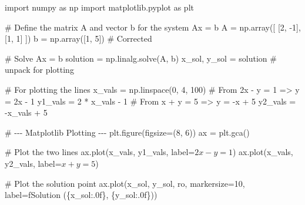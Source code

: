 \documentclass[
  letterpaper,
  DIV=11,
  numbers=noendperiod]{scrreprt}
\newenvironment{Shaded}{\begin{snugshade}}{\end{snugshade}}
\newcommand{\CommentTok}[1]{\textcolor[rgb]{0.37,0.37,0.37}{#1}}
\newcommand{\DecValTok}[1]{\textcolor[rgb]{0.68,0.00,0.00}{#1}}
\newcommand{\ImportTok}[1]{\textcolor[rgb]{0.00,0.46,0.62}{#1}}
\newcommand{\NormalTok}[1]{\textcolor[rgb]{0.00,0.23,0.31}{#1}}
\newcommand{\OperatorTok}[1]{\textcolor[rgb]{0.37,0.37,0.37}{#1}}
\newcommand{\SpecialCharTok}[1]{\textcolor[rgb]{0.37,0.37,0.37}{#1}}
\newcommand{\SpecialStringTok}[1]{\textcolor[rgb]{0.13,0.47,0.30}{#1}}
\newcommand{\StringTok}[1]{\textcolor[rgb]{0.13,0.47,0.30}{#1}}
\begin{document}
\begin{Shaded}
\begin{Highlighting}[]
\ImportTok{import}\NormalTok{ numpy }\ImportTok{as}\NormalTok{ np}
\ImportTok{import}\NormalTok{ matplotlib.pyplot }\ImportTok{as}\NormalTok{ plt}

\CommentTok{\# Define the matrix A and vector b for the system Ax = b}
\NormalTok{A }\OperatorTok{=}\NormalTok{ np.array([}
\NormalTok{    [}\DecValTok{2}\NormalTok{, }\OperatorTok{{-}}\DecValTok{1}\NormalTok{],}
\NormalTok{    [}\DecValTok{1}\NormalTok{,  }\DecValTok{1}\NormalTok{]}
\NormalTok{])}
\NormalTok{b }\OperatorTok{=}\NormalTok{ np.array([}\DecValTok{1}\NormalTok{, }\DecValTok{5}\NormalTok{])  }\CommentTok{\# Corrected}

\CommentTok{\# Solve Ax = b}
\NormalTok{solution }\OperatorTok{=}\NormalTok{ np.linalg.solve(A, b)}
\NormalTok{x\_sol, y\_sol }\OperatorTok{=}\NormalTok{ solution  }\CommentTok{\# unpack for plotting}

\CommentTok{\# For plotting the lines}
\NormalTok{x\_vals }\OperatorTok{=}\NormalTok{ np.linspace(}\DecValTok{0}\NormalTok{, }\DecValTok{4}\NormalTok{, }\DecValTok{100}\NormalTok{)}
\CommentTok{\# From 2x {-} y = 1  =\textgreater{} y = 2x {-} 1}
\NormalTok{y1\_vals }\OperatorTok{=} \DecValTok{2} \OperatorTok{*}\NormalTok{ x\_vals }\OperatorTok{{-}} \DecValTok{1}
\CommentTok{\# From x + y = 5   =\textgreater{} y = {-}x + 5}
\NormalTok{y2\_vals }\OperatorTok{=} \OperatorTok{{-}}\NormalTok{x\_vals }\OperatorTok{+} \DecValTok{5}

\CommentTok{\# {-}{-}{-} Matplotlib Plotting {-}{-}{-}}
\NormalTok{plt.figure(figsize}\OperatorTok{=}\NormalTok{(}\DecValTok{8}\NormalTok{, }\DecValTok{6}\NormalTok{))}
\NormalTok{ax }\OperatorTok{=}\NormalTok{ plt.gca()}

\CommentTok{\# Plot the two lines}
\NormalTok{ax.plot(x\_vals, y1\_vals, label}\OperatorTok{=}\StringTok{\textquotesingle{}$2x {-} y = 1$\textquotesingle{}}\NormalTok{)}
\NormalTok{ax.plot(x\_vals, y2\_vals, label}\OperatorTok{=}\StringTok{\textquotesingle{}$x + y = 5$\textquotesingle{}}\NormalTok{)}

\CommentTok{\# Plot the solution point}
\NormalTok{ax.plot(x\_sol, y\_sol, }\StringTok{\textquotesingle{}ro\textquotesingle{}}\NormalTok{, markersize}\OperatorTok{=}\DecValTok{10}\NormalTok{, label}\OperatorTok{=}\SpecialStringTok{f\textquotesingle{}Solution (}\SpecialCharTok{\{}\NormalTok{x\_sol}\SpecialCharTok{:.0f\}}\SpecialStringTok{, }\SpecialCharTok{\{}\NormalTok{y\_sol}\SpecialCharTok{:.0f\}}\SpecialStringTok{)\textquotesingle{}}\NormalTok{)}


\end{Highlighting}
\end{Shaded}
\end{document}

